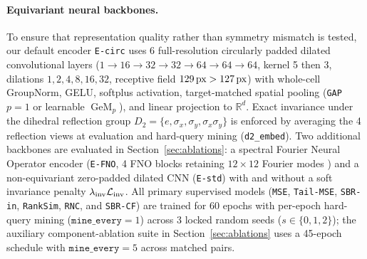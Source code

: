 \documentclass[preprint,11pt,a4paper]{elsarticle}
\newcommand{\R}{\mathbb{R}}
\newcommand{\GeM}{\operatorname{GeM}}
\begin{document}
\paragraph{Equivariant neural backbones.}
To ensure that representation quality rather than symmetry mismatch is tested, our default encoder \texttt{E-circ} uses 6 full-resolution circularly padded dilated convolutional layers ($1\to 16\to 32\to 32\to 64\to 64\to 64$, kernel 5 then 3, dilations $1,2,4,8,16,32$, receptive field $129\text{\,px}>127\text{\,px}$) with whole-cell GroupNorm, GELU, softplus activation, target-matched spatial pooling (\texttt{GAP} $p=1$ or learnable $\GeM_p$), and linear projection to $\R^d$. Exact invariance under the dihedral reflection group $D_2=\{e,\sigma_x,\sigma_y,\sigma_x\sigma_y\}$ is enforced by averaging the 4 reflection views at evaluation and hard-query mining (\texttt{d2\_embed}). Two additional backbones are evaluated in Section~\ref{sec:ablations}: a spectral Fourier Neural Operator encoder (\texttt{E-FNO}, 4 FNO blocks retaining $12\times 12$ Fourier modes \cite{FNO2021}) and a non-equivariant zero-padded dilated CNN (\texttt{E-std}) with and without a soft invariance penalty $\lambda_{\rm inv}\mathcal L_{\rm inv}$. All primary supervised models (\texttt{MSE}, \texttt{Tail-MSE}, \texttt{SBR-in}, \texttt{RankSim}, \texttt{RNC}, and \texttt{SBR-CF}) are trained for 60 epochs with per-epoch hard-query mining ($\texttt{mine\_every}=1$) across 3 locked random seeds ($s\in\{0,1,2\}$); the auxiliary component-ablation suite in Section~\ref{sec:ablations} uses a 45-epoch schedule with $\texttt{mine\_every}=5$ across matched pairs.
\end{document}
